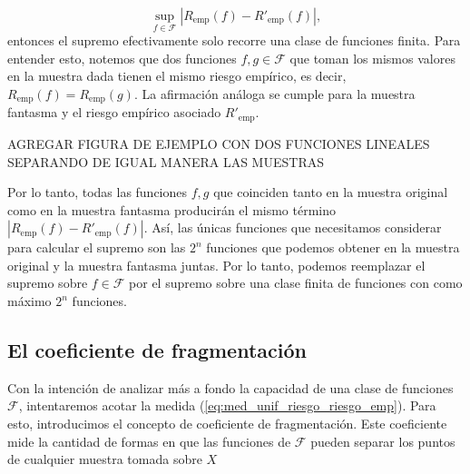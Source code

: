 \documentclass{report}
\begin{document}
\[
\sup_{f \in \mathcal{F}} |R_{\text{emp}}(f) - R'_{\text{emp}}(f)|,
\]
entonces el supremo efectivamente solo recorre una clase de funciones finita. Para entender esto, notemos que 
dos funciones \(f, g \in \mathcal{F}\) que toman los mismos valores en la muestra dada tienen el mismo riesgo empírico, 
es decir, \(R_{\text{emp}}(f) = R_{\text{emp}}(g)\). La afirmación análoga se cumple para la muestra fantasma 
y el riesgo empírico asociado \(R'_{\text{emp}}\). \newline

AGREGAR FIGURA DE EJEMPLO CON DOS FUNCIONES LINEALES SEPARANDO DE IGUAL MANERA LAS MUESTRAS\newline

Por lo tanto, todas las funciones \(f, g\) que coinciden tanto en la muestra original como en la muestra fantasma 
producirán el mismo término \(|R_{\text{emp}}(f) - R'_{\text{emp}}(f)|\). Así, las únicas funciones que 
necesitamos considerar para calcular el supremo son las \(2^{n}\) funciones que podemos obtener en la muestra 
original y la muestra fantasma juntas. Por lo tanto, podemos reemplazar el supremo sobre \(f \in \mathcal{F}\) por el 
supremo sobre una clase finita de funciones con como máximo \(2^{n}\) funciones.\newline


\subsection{El coeficiente de fragmentación}

Con la intención de analizar más a fondo la capacidad de una clase de funciones 
\(\mathcal{F}\), intentaremos acotar la medida (\ref{eq:med_unif_riesgo_riesgo_emp}).
Para esto, introducimos el concepto de coeficiente de fragmentación.  Este coeficiente mide la 
cantidad de formas en que las funciones de \(\mathcal{F}\) pueden separar los puntos de cualquier muestra
tomada sobre $X$\newline
\end{document}
